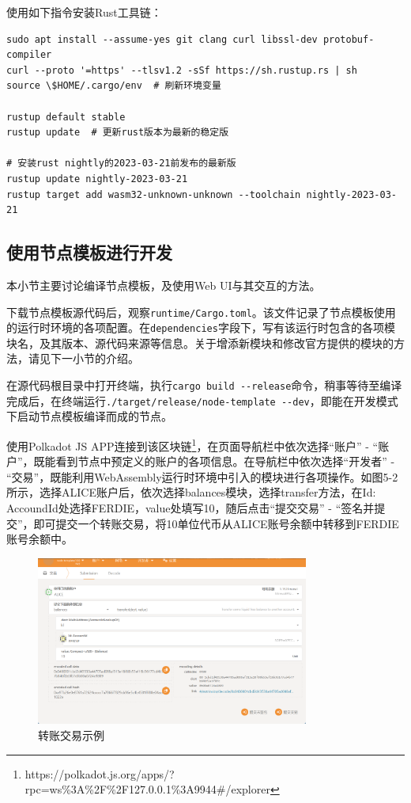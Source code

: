 使用如下指令安装Rust工具链：

\begin{lstlisting}[caption={安装Rust工具链}, label={lst:安装Rust工具链}]
sudo apt install --assume-yes git clang curl libssl-dev protobuf-compiler
curl --proto '=https' --tlsv1.2 -sSf https://sh.rustup.rs | sh
source \$HOME/.cargo/env  # 刷新环境变量

rustup default stable
rustup update  # 更新rust版本为最新的稳定版

# 安装rust nightly的2023-03-21前发布的最新版
rustup update nightly-2023-03-21
rustup target add wasm32-unknown-unknown --toolchain nightly-2023-03-21
\end{lstlisting}

\subsection{使用节点模板进行开发}

本小节主要讨论编译节点模板，及使用Web UI与其交互的方法。

下载节点模板源代码后，观察\verb|runtime/Cargo.toml|。该文件记录了节点模板使用的运行时环境的各项配置。在\verb|dependencies|字段下，写有该运行时包含的各项模块名，及其版本、源代码来源等信息。关于增添新模块和修改官方提供的模块的方法，请见下一小节的介绍。

在源代码根目录中打开终端，执行\verb|cargo build --release|命令，稍事等待至编译完成后，在终端运行\verb|./target/release/node-template --dev|，即能在开发模式下启动节点模板编译而成的节点。

使用Polkadot JS APP连接到该区块链\footnote{https://polkadot.js.org/apps/?rpc=ws\%3A\%2F\%2F127.0.0.1\%3A9944\#/explorer}，在页面导航栏中依次选择“账户” - “账户”，既能看到节点中预定义的账户的各项信息。在导航栏中依次选择“开发者” - “交易”，既能利用WebAssembly运行时环境中引入的模块进行各项操作。如图5-2所示，选择ALICE账户后，依次选择balances模块，选择transfer方法，在Id: AccoundId处选择FERDIE，value处填写10，随后点击“提交交易” - “签名并提交”，即可提交一个转账交易，将10单位代币从ALICE账号余额中转移到FERDIE账号余额中。

\begin{figure}[htbp]
    \centering
    \includegraphics[width=0.8\textwidth]{images/substrateTransfer.png}
    \caption{转账交易示例}\label{转账交易示例} %
\end{figure}

